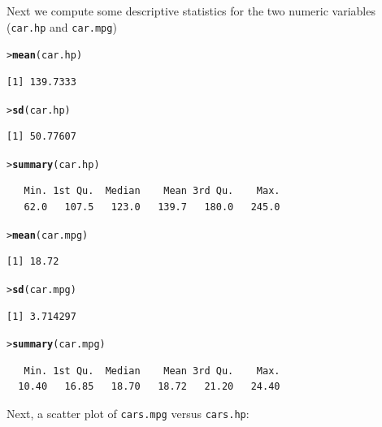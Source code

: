 \documentclass[12pt,oneside]{book}\usepackage[]{graphicx}\usepackage[]{color}
\makeatletter
\newcommand{\hlstd}[1]{\textcolor[rgb]{0.345,0.345,0.345}{#1}}%
\newcommand{\hlkwd}[1]{\textcolor[rgb]{0.737,0.353,0.396}{\textbf{#1}}}%
\newenvironment{kframe}{%
 \def\at@end@of@kframe{}%
 \ifinner\ifhmode%
  \def\at@end@of@kframe{\end{minipage}}%
  \begin{minipage}{\columnwidth}%
 \fi\fi%
 \def\FrameCommand##1{\hskip\@totalleftmargin \hskip-\fboxsep
 \colorbox{shadecolor}{##1}\hskip-\fboxsep
     \hskip-\linewidth \hskip-\@totalleftmargin \hskip\columnwidth}%
 \MakeFramed {\advance\hsize-\width
   \@totalleftmargin\z@ \linewidth\hsize
   \@setminipage}}%
 {\par\unskip\endMakeFramed%
 \at@end@of@kframe}
\newenvironment{knitrout}{}{} %
\makeatother
\begin{document}
Next we compute some descriptive statistics for the two numeric variables (\texttt{car.hp} and \texttt{car.mpg})
\begin{knitrout}
\color{fgcolor}\begin{kframe}
\begin{alltt}
\hlstd{> }\hlkwd{mean}\hlstd{(car.hp)}
\end{alltt}
\begin{verbatim}
[1] 139.7333
\end{verbatim}
\begin{alltt}
\hlstd{> }\hlkwd{sd}\hlstd{(car.hp)}
\end{alltt}
\begin{verbatim}
[1] 50.77607
\end{verbatim}
\begin{alltt}
\hlstd{> }\hlkwd{summary}\hlstd{(car.hp)}
\end{alltt}
\begin{verbatim}
   Min. 1st Qu.  Median    Mean 3rd Qu.    Max. 
   62.0   107.5   123.0   139.7   180.0   245.0 
\end{verbatim}
\begin{alltt}
\hlstd{> }\hlkwd{mean}\hlstd{(car.mpg)}
\end{alltt}
\begin{verbatim}
[1] 18.72
\end{verbatim}
\begin{alltt}
\hlstd{> }\hlkwd{sd}\hlstd{(car.mpg)}
\end{alltt}
\begin{verbatim}
[1] 3.714297
\end{verbatim}
\begin{alltt}
\hlstd{> }\hlkwd{summary}\hlstd{(car.mpg)}
\end{alltt}
\begin{verbatim}
   Min. 1st Qu.  Median    Mean 3rd Qu.    Max. 
  10.40   16.85   18.70   18.72   21.20   24.40 
\end{verbatim}
\end{kframe}
\end{knitrout}
Next, a scatter plot of \verb+cars.mpg+ versus \verb+cars.hp+:
\end{document}
